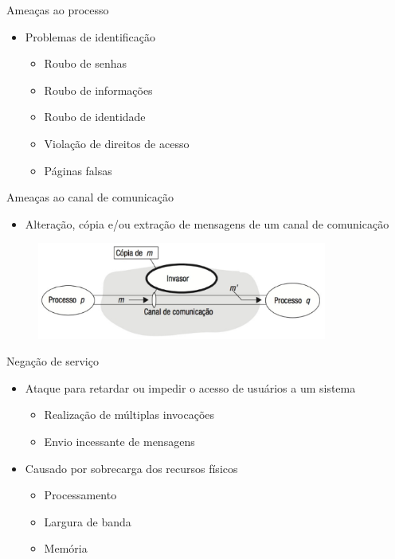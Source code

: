 \documentclass[aspectratio=169,
				xcolor=table]{beamer}
\begin{document}
	\begin{frame}{Ameaças ao processo}
		\begin{itemize}
			\item Problemas de identificação 
			\begin{itemize}
				\item Roubo de senhas
				\item Roubo de informações
				\item Roubo de identidade
				\item Violação de direitos de acesso
				\item Páginas falsas

			\end{itemize}

		\end{itemize}
	\end{frame}
	
	\begin{frame}{Ameaças ao canal de comunicação}
		\begin{itemize}
			\item Alteração, cópia e/ou extração de mensagens de um canal de comunicação
		\end{itemize}
		
		\begin{figure}[hbtp]
		\centering
		\includegraphics[width=0.85\textwidth, keepaspectratio]{../figs/cap03/ameacacanal.png}
		\end{figure}	
	\end{frame}
	
	\begin{frame}{Negação de serviço}
		\begin{itemize}
			\item Ataque para retardar ou impedir o acesso de usuários a um sistema
			\begin{itemize}
				\item Realização de múltiplas invocações 
				\item Envio incessante de mensagens
			\end{itemize}
			\vspace{1em}
			\item Causado por sobrecarga dos recursos físicos
			\begin{itemize}
				\item Processamento
				\item Largura de banda
				\item Memória
			\end{itemize}
		\end{itemize}
	\end{frame}
	
\end{document}
